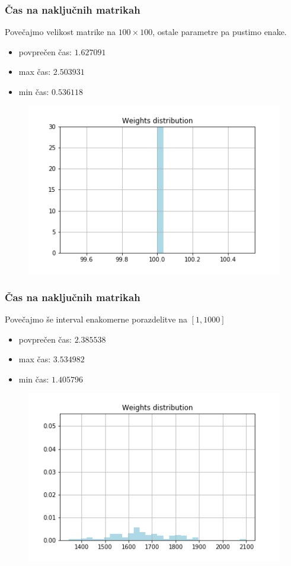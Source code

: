 \documentclass{beamer}
\begin{document}
\begin{frame}
    \frametitle{Čas na naključnih matrikah}
    \begin{block}{}
        Povečajmo velikost matrike na $100 \times 100$, ostale parametre pa pustimo enake.
        \begin{itemize}
            \item povprečen čas: $1.627091$
            \item max čas: $2.503931$
            \item min čas: $0.536118$
        \end{itemize}
    \end{block}
    \begin{figure}[htbp]
        \centerline{\includegraphics[scale=0.40]{picture111min.png}}
    \end{figure}
\end{frame}

\begin{frame}
    \frametitle{Čas na naključnih matrikah}
    \begin{block}{}
        Povečajmo še interval enakomerne porazdelitve na $[1, 1000]$
        \begin{itemize}
            \item povprečen čas: $2.385538$
            \item max čas: $3.534982$
            \item min čas: $1.405796$
        \end{itemize}
    \end{block}
    \begin{figure}[htbp]
        \centerline{\includegraphics[scale=0.40]{picture1101min.png}}
    \end{figure}
\end{frame}
\end{document}
